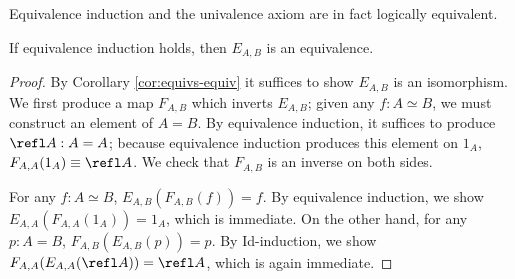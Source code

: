 Equivalence induction and the univalence axiom are in fact logically equivalent.
\begin{lem}
If equivalence induction holds, then $E_{A,B}$ is an equivalence.
\end{lem}
\begin{proof}
By Corollary \ref{cor:equivs-equiv} it suffices to show $E_{A,B}$ is an
isomorphism. We first produce a map $F_{A,B}$ which inverts $E_{A,B}$; given any
$f:A\simeq B$, we must construct an element of $A=B$. By equivalence induction, it
suffices to produce $\refl A:A=A$; because equivalence induction produces this
element on $1_A$, $F_{A,A}(1_A)\equiv \refl A$.
We check that $F_{A,B}$ is an inverse on both sides.

For any $f:A\simeq B$, $E_{A,B}(F_{A,B}(f))=f$. By equivalence induction, we
show $E_{A,A}(F_{A,A}(1_A))=1_A$, which is immediate. On the other hand, for any
$p:A=B$, $F_{A,B}(E_{A,B}(p))=p$. By Id-induction, we show
$F_{A,A}(E_{A,A}(\refl A))=\refl A$, which is again immediate.
\end{proof}

